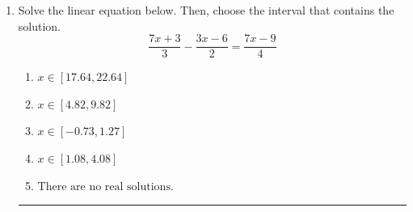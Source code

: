 \documentclass[14pt]{extbook}
\newcommand{\litem}[1]{\item#1\hspace*{-1cm}\rule{\textwidth}{0.4pt}}
\begin{document}
\begin{enumerate}
{\begin{enumerate}[label=\Alph*.]
\end{enumerate} }
\litem{
Solve the linear equation below. Then, choose the interval that contains the solution.\[ \frac{7x + 3}{3} - \frac{3x -6}{2} = \frac{7x -9}{4} \]\begin{enumerate}[label=\Alph*.]
\item \( x \in [17.64, 22.64] \)
\item \( x \in [4.82, 9.82] \)
\item \( x \in [-0.73, 1.27] \)
\item \( x \in [1.08, 4.08] \)
\item \( \text{There are no real solutions.} \)

\end{enumerate} }
\end{enumerate}
\end{document}

